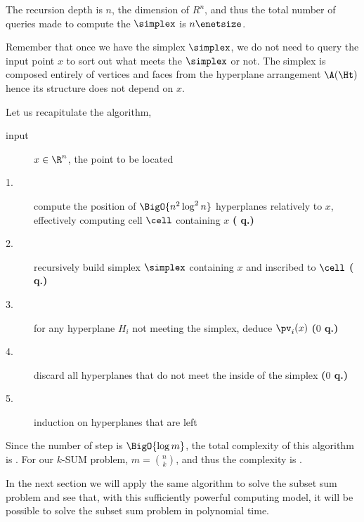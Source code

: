 The recursion depth is $n$, the dimension of $R^n$, and thus the total number
of queries made to compute the $\simplex$ is $n \enetsize$.

Remember that once we have the simplex $\simplex$, we do not need to query the input point
$x$ to sort out what meets the $\simplex$ or not. The simplex is composed
entirely of vertices and faces from the hyperplane arrangement $\A(\Ht)$ hence
its structure does not depend on $x$.

Let us recapitulate the algorithm,

\begin{description}
\item[input] $x \in \R^n$, the point to be located
\item[1.] compute the position of $\BigO{n^2 \log^2 n}$ hyperplanes relatively to
$x$, effectively computing cell $\cell$ containing $x$ \textbf{( q.)}
\item[2.] recursively build simplex $\simplex$ containing $x$ and inscribed to $\cell$
\textbf{( q.)}
\item[3.] for any hyperplane $H_i$ not meeting the simplex, deduce $\pv_i(x)$
\textbf{($0$ q.)}
\item[4.] discard all hyperplanes that do not meet the inside of the
simplex \textbf{($0$ q.)}
\item[5.] induction on hyperplanes that are left
\end{description}

Since the number of step is $\BigO{\log m}$, the total complexity of this algorithm
is . For our $k$-SUM problem, $m = \binom{n}{k}$,
and thus the complexity is .

In the next section we will apply the same algorithm to solve the
subset sum problem and see that, with this sufficiently powerful computing
model, it will be possible to solve the subset sum problem in polynomial time.

